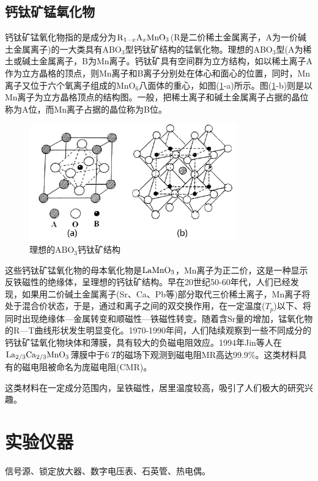 \documentclass[a4paper]{article}
\begin{document}
\subsection{钙钛矿锰氧化物}
钙钛矿锰氧化物指的是成分为$\ce{R_{1-x}A_xMnO_3}$(R是二价稀土金属离子，A为一价碱土金属离子)的一大类具有ABO$_3$型钙钛矿结构的锰氧化物。理想的ABO$_3$型(A为稀土或碱土金属离子，B为Mn离子。钙钛矿具有空间群为立方结构，如以稀土离子A作为立方晶格的顶点，则Mn离子和B离子分别处在体心和面心的位置，同时，Mn离子又位于六个氧离子组成的MnO$_6$八面体的重心，如图(\ref{fig3}-a)所示。图(\ref{fig3}-b)则是以Mn离子为立方晶格顶点的结构图。一般，把稀土离子和碱土金属离子占据的晶位称为A位，而Mn离子占据的晶位称为B位。
\begin{figure}[H]
    \centering
    \includegraphics[width=0.8\textwidth]{fig/fig3.pdf}
    \caption{理想的$\text{ABO}_3$钙钛矿结构}\label{fig3}
\end{figure}
这些钙钛矿锰氧化物的母本氧化物是$ \ce{LaMnO_3} $，Mn离子为正二价，这是一种显示反铁磁性的绝缘体，呈理想的钙钛矿结构。早在20世纪50-60年代，人们已经发现，如果用二价碱土金属离子(Sr、Ca、Pb等)部分取代三价稀土离子，Mn离子将处于混合价状态，于是，通过和离子之间的双交换作用\cite{jonker1950ferromagnetic}\cite{van1950electrical}，在一定温度($T_p$)以下、将同时出现绝缘体—金属转变和顺磁性—铁磁性转变\cite{anderson1955considerations}\cite{zener1951interaction}。随着含Sr量的增加，锰氧化物的R—T曲线形状发生明显变化。1970-1990年间，人们陆续观察到一些不同成分的钙钛矿锰氧化物块体和薄膜，具有较大的负磁电阻效应。1994年Jin等人在$ \ce{La_{2/3}Ca_{2/3}MnO_3} $薄膜中于$ \SI{6}{T} $的磁场下观测到磁电阻MR高达99.9\%\cite{jin1994colossal}\cite{jin1994thousandfold}\cite{mccormack1994very}。这类材料具有的磁电阻被命名为庞磁电阻(CMR)。

这类材料在一定成分范围内，呈铁磁性，居里温度较高，吸引了人们极大的研究兴趣。

\section{实验仪器}
信号源、锁定放大器、数字电压表、石英管、热电偶。
\end{document}
